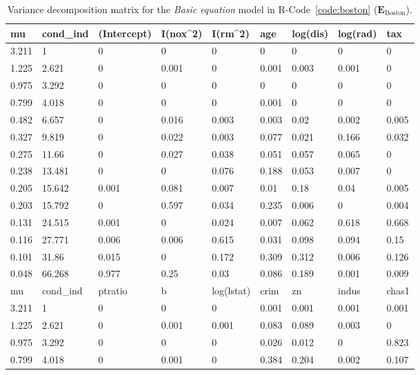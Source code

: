 \documentclass[11pt,a4paper,twoside]{book}\usepackage[]{graphicx}\usepackage[]{xcolor}
\begin{document}
\begin{table}[H]\begin{center}
\caption{Variance decomposition matrix for the \textit{Basic equation} model in \textsf{R}-Code~\ref{code:boston} ($\boldsymbol{E}_\text{Boston}$).}\label{tab:vardecomp}
\begingroup\footnotesize
\begin{tabular}{lllllllll}
  \toprule
 mu & cond\_ind & (Intercept) & I(nox\textasciicircum 2) & I(rm\textasciicircum 2) & age & log(dis) & log(rad) & tax \\ 
   \midrule
3.211 & 1 & 0 & 0 & 0 & 0 & 0 & 0 & 0 \\ 
  1.225 & 2.621 & 0 & 0.001 & 0 & 0.001 & 0.003 & 0.001 & 0 \\ 
  0.975 & 3.292 & 0 & 0 & 0 & 0 & 0 & 0 & 0 \\ 
  0.799 & 4.018 & 0 & 0 & 0 & 0.001 & 0 & 0 & 0 \\ 
  0.482 & 6.657 & 0 & 0.016 & 0.003 & 0.003 & 0.02 & 0.002 & 0.005 \\ 
  0.327 & 9.819 & 0 & 0.022 & 0.003 & 0.077 & 0.021 & 0.166 & 0.032 \\ 
  0.275 & 11.66 & 0 & 0.027 & 0.038 & 0.051 & 0.057 & 0.065 & 0 \\ 
  0.238 & 13.481 & 0 & 0 & 0.076 & 0.188 & 0.053 & 0.007 & 0 \\ 
  0.205 & 15.642 & 0.001 & 0.081 & 0.007 & 0.01 & 0.18 & 0.04 & 0.005 \\ 
  0.203 & 15.792 & 0 & 0.597 & 0.034 & 0.235 & 0.006 & 0 & 0.004 \\ 
  0.131 & 24.515 & 0.001 & 0 & 0.024 & 0.007 & 0.062 & 0.618 & 0.668 \\ 
  0.116 & 27.771 & 0.006 & 0.006 & 0.615 & 0.031 & 0.098 & 0.094 & 0.15 \\ 
  0.101 & 31.86 & 0.015 & 0 & 0.172 & 0.309 & 0.312 & 0.006 & 0.126 \\ 
  0.048 & 66.268 & 0.977 & 0.25 & 0.03 & 0.086 & 0.189 & 0.001 & 0.009 \\ 
   \midrule
mu & cond\_ind & ptratio & b & log(lstat) & crim & zn & indus & chas1 \\ 
   \midrule
3.211 & 1 & 0 & 0 & 0 & 0.001 & 0.001 & 0.001 & 0.001 \\ 
  1.225 & 2.621 & 0 & 0.001 & 0.001 & 0.083 & 0.089 & 0.003 & 0 \\ 
  0.975 & 3.292 & 0 & 0 & 0 & 0.026 & 0.012 & 0 & 0.823 \\ 
  0.799 & 4.018 & 0 & 0.001 & 0 & 0.384 & 0.204 & 0.002 & 0.107 \\ 

\end{tabular}
\end{center}
\end{table}
\end{document}
